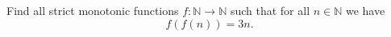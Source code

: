 Find all strict monotonic functions $f\colon \mathbb{N}\rightarrow \mathbb{N}$ such that
for all $n \in \mathbb{N}$ we have
$$f(f(n))=3n.$$